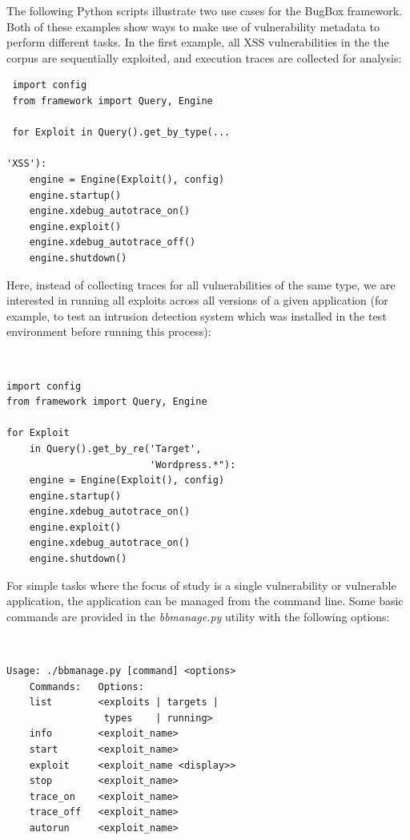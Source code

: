 \documentclass[letterpaper,twocolumn,10pt]{article}
\begin{document}
The following Python scripts illustrate two use cases for the BugBox framework. Both of these examples show ways to make use of vulnerability metadata to perform different tasks. In the first example, all XSS vulnerabilities in the the corpus are sequentially exploited, and execution traces are collected for analysis:

\begin{minipage}{\textwidth}
{\tt \footnotesize

\begin{lstlisting}
 import config
 from framework import Query, Engine
 
 for Exploit in Query().get_by_type(...
 																'XSS'):
    engine = Engine(Exploit(), config)
    engine.startup()
    engine.xdebug_autotrace_on()
    engine.exploit()
    engine.xdebug_autotrace_off()
    engine.shutdown()
\end{lstlisting}
}
\end{minipage}


Here, instead of collecting traces for all vulnerabilities of the same type, we are interested in running all exploits across all versions of a given application (for example, to test an intrusion detection system which was installed in the test environment before running this process):

\begin{minipage}{\textwidth}
{\tt \footnotesize
\begin{lstlisting}
import config
from framework import Query, Engine

for Exploit 
    in Query().get_by_re('Target', 
                         'Wordpress.*"):
    engine = Engine(Exploit(), config)
    engine.startup()
    engine.xdebug_autotrace_on()
    engine.exploit()
    engine.xdebug_autotrace_on()
    engine.shutdown()
\end{lstlisting}
}
\end{minipage}

For simple tasks where the focus of study is a single vulnerability or vulnerable application, the application can be managed from the command line. Some basic commands are provided in the \emph{bbmanage.py} utility with the following options:

{\tt \footnotesize
\begin{verbatim}
Usage: ./bbmanage.py [command] <options>
    Commands:   Options:
    list        <exploits | targets | 
                 types    | running>
    info        <exploit_name>
    start       <exploit_name>
    exploit     <exploit_name <display>>
    stop        <exploit_name>
    trace_on    <exploit_name>
    trace_off   <exploit_name>
    autorun     <exploit_name>
\end{verbatim}
}
\end{document}
